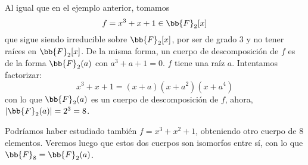 \begin{ejemplo}
    Al igual que en el ejemplo anterior, tomamos
    \begin{equation*}
        f = x^3+x+1 \in \bb{F}_2[x]
    \end{equation*}
    que sigue siendo irreducible sobre $\bb{F}_2[x]$, por ser de grado 3 y no tener raíces en $\bb{F}_2[x]$. De la misma forma, un cuerpo de descomposición de $f$ es de la forma $\bb{F}_2(a)$ con $a^3+a+1=0$. $f$ tiene una raíz $a$. Intentamos factorizar: %
    \begin{equation*}
        x^3+x+1 = (x+a)(x+a^2)(x+a^4)
    \end{equation*}
    con lo que $\bb{F}_2(a)$ es un cuerpo de descomposición de $f$, ahora, $|\bb{F}_2(a)| = 2^3 = 8$.

    \noindent
    Podríamos haber estudiado también $f=x^3+x^2+1$, obteniendo otro cuerpo de $8$ elementos. Veremos luego que estos dos cuerpos son isomorfos entre sí, con lo que $\bb{F}_8 = \bb{F}_2(a)$.
\end{ejemplo}
